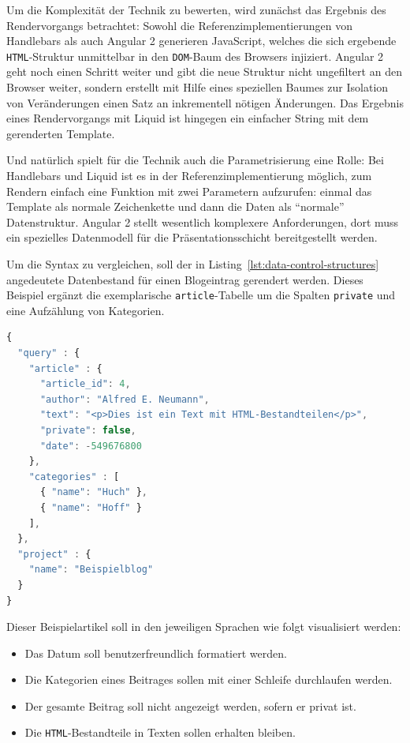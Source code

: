 Um die Komplexität der Technik zu bewerten, wird zunächst das Ergebnis des Rendervorgangs betrachtet: Sowohl die Referenzimplementierungen von Handlebars als auch Angular 2 generieren JavaScript, welches die sich ergebende \texttt{HTML}-Struktur unmittelbar in den \texttt{DOM}-Baum des Browsers injiziert. Angular 2 geht noch einen Schritt weiter und gibt die neue Struktur nicht ungefiltert an den Browser weiter, sondern erstellt mit Hilfe eines speziellen Baumes zur Isolation von Veränderungen einen Satz an inkrementell nötigen Änderungen. Das Ergebnis eines Rendervorgangs mit Liquid ist hingegen ein einfacher String mit dem gerenderten Template.

Und natürlich spielt für die Technik auch die Parametrisierung eine Rolle: Bei Handlebars und Liquid ist es in der Referenzimplementierung möglich, zum Rendern einfach eine Funktion mit zwei Parametern aufzurufen: einmal das Template als normale Zeichenkette und dann die Daten als "`normale"' Datenstruktur. Angular 2 stellt wesentlich komplexere Anforderungen, dort muss ein spezielles Datenmodell für die Präsentationsschicht bereitgestellt werden.

Um die Syntax zu vergleichen, soll der in Listing~\ref{lst:data-control-structures} angedeutete Datenbestand für einen Blogeintrag gerendert werden. Dieses Beispiel ergänzt die exemplarische \texttt{article}-Tabelle um die Spalten \texttt{private} und eine Aufzählung von Kategorien.

\begin{lstlisting}[float=h!, language=JavaScript, caption={JSON-Darstellung eines exemplarischen Datenbestandes}, label={lst:data-control-structures}]
{
  "query" : {
    "article" : {
      "article_id": 4,
      "author": "Alfred E. Neumann",
      "text": "<p>Dies ist ein Text mit HTML-Bestandteilen</p>",
      "private": false,
      "date": -549676800
    },
    "categories" : [
      { "name": "Huch" },
      { "name": "Hoff" }
    ],
  },
  "project" : {
    "name": "Beispielblog"
  }
}
\end{lstlisting}

Dieser Beispielartikel soll in den jeweiligen Sprachen wie folgt visualisiert werden:
\begin{itemize}[noitemsep]
\item Das Datum soll benutzerfreundlich formatiert werden.
\item Die Kategorien eines Beitrages sollen mit einer Schleife durchlaufen werden.
\item Der gesamte Beitrag soll nicht angezeigt werden, sofern er privat ist.
\item Die \texttt{HTML}-Bestandteile in Texten sollen erhalten bleiben.
\end{itemize}

